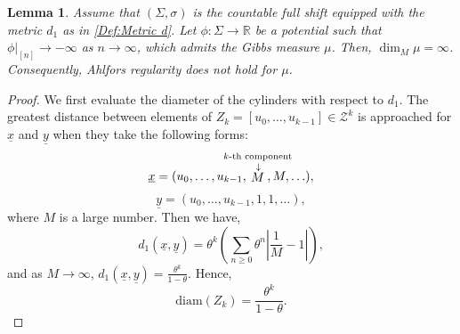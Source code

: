 \documentclass[11pt, reqno]{amsart}
\theoremstyle{plain}%
\newtheorem{lemma}[theorem]{Lemma}
\theoremstyle{definition}
\theoremstyle{definition}
\def\R{\ensuremath{\mathbb R}}
\def\st{such that }
\def\ulx{\underline{x}}
\def\uly{\underline{y}}
\numberwithin{equation}{section}
\begin{document}
\begin{lemma}\label{Lemma: No Ahlfors exists}
     Assume that $(\Sigma,\sigma)$ is the countable full shift equipped with the metric $d_1$ as in \eqref{Def:Metric d}. Let $\phi:\Sigma\to\R$ be a potential \st $\phi\big|_{[n]}\to-\infty$ as $n\to \infty$, which admits the Gibbs measure  $\mu$. Then, $\dim_M\mu=\infty$. Consequently, Ahlfors regularity does not hold for $\mu$.
\end{lemma}
\begin{proof}
    We first evaluate the diameter of the cylinders with respect to $d_1$. The greatest distance between elements of $Z_k=[u_0,\ldots,u_{k-1}]\in \mathcal{Z}^k$ is approached for $\ulx$ and $\uly$ when they take the following forms:
$$\ulx=(u_0,\ldots,u_{k-1},\!\!\!\!\!\!\!\!\!\!\!\!\stackrel{\scriptstyle k\text{-th component}}{\stackrel{\small{\downarrow}}M}\!\!\!\!\!\!\!\!\!\!\!\!,M,\ldots),$$
$$\uly=(u_0,\ldots,u_{k-1},1,1,\ldots),$$
where $M$ is a large number. Then we have, $$ d_1(\ulx,\underline{y})=\theta^k\left(\sum_{n\ge 0} \theta^n \left| \frac{1}{M} - 1 \right|\right),$$
and as $M\to \infty$, $d_1(\ulx,\underline{y})=\frac{\theta^k}{1-\theta}$. Hence,
\begin{equation}\label{Diam_Cylinder_Full}
    \text{diam}(Z_k)=\frac{\theta^k}{1-\theta}. 
\end{equation}


\end{proof}
\end{document}
